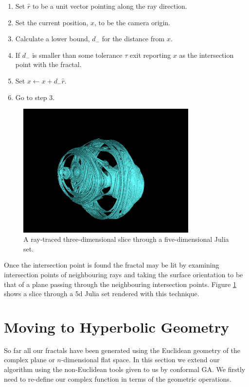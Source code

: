 \begin{enumerate}
\item Set $\hat{r}$ to be a unit vector pointing along the ray direction.
\item Set the current position, $x$, to be the camera origin.
\item Calculate a lower bound, $d_-$ for the distance from $x$. 
\item If $d_-$ is smaller than some tolerance $\tau$ exit reporting
$x$ as the intersection point with the fractal.
\item Set $x \leftarrow x + d_-\hat{r}$.
\item Go to step 3.
\end{enumerate}

\begin{figure}
\centering
\includegraphics[width=0.8\textwidth]{5djulia}
\caption{\label{fig:5djulia}
  A ray-traced three-dimensional slice through a five-dimensional Julia set.
}
\end{figure}

Once the intersection point is found the fractal may be lit by examining
intersection points of neighbouring rays and taking the surface orientation
to be that of a plane passing through the neighbouring intersection points.
Figure \ref{fig:5djulia} shows a slice through a 5d Julia set rendered with
this technique.

\section{Moving to Hyperbolic Geometry}

So far all our fractals have been generated using the Euclidean geometry of
the complex plane or $n$-dimensional flat space. In this section we
extend our algorithm using the non-Euclidean tools
given to us by conformal GA. We firstly need to re-define our complex function
in terms of the geometric operations.

